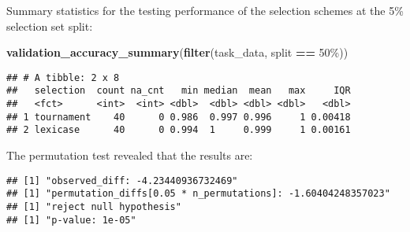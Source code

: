 \documentclass[
]{book}
\newenvironment{Shaded}{\begin{snugshade}}{\end{snugshade}}
\newcommand{\AttributeTok}[1]{\textcolor[rgb]{0.13,0.29,0.53}{#1}}
\newcommand{\DecValTok}[1]{\textcolor[rgb]{0.00,0.00,0.81}{#1}}
\newcommand{\FunctionTok}[1]{\textcolor[rgb]{0.13,0.29,0.53}{\textbf{#1}}}
\newcommand{\NormalTok}[1]{#1}
\newcommand{\OtherTok}[1]{\textcolor[rgb]{0.56,0.35,0.01}{#1}}
\newcommand{\SpecialCharTok}[1]{\textcolor[rgb]{0.81,0.36,0.00}{\textbf{#1}}}
\newcommand{\StringTok}[1]{\textcolor[rgb]{0.31,0.60,0.02}{#1}}
\begin{document}
Summary statistics for the testing performance of the selection schemes at the 5\% selection set split:

\begin{Shaded}
\begin{Highlighting}[]
\FunctionTok{validation\_accuracy\_summary}\NormalTok{(}\FunctionTok{filter}\NormalTok{(task\_data, split }\SpecialCharTok{==} \StringTok{\textquotesingle{}50\%\textquotesingle{}}\NormalTok{))}
\end{Highlighting}
\end{Shaded}

\begin{verbatim}
## # A tibble: 2 x 8
##   selection  count na_cnt   min median  mean   max     IQR
##   <fct>      <int>  <int> <dbl>  <dbl> <dbl> <dbl>   <dbl>
## 1 tournament    40      0 0.986  0.997 0.996     1 0.00418
## 2 lexicase      40      0 0.994  1     0.999     1 0.00161
\end{verbatim}

The permutation test revealed that the results are:

\begin{Shaded}
\end{Shaded}

\begin{verbatim}
## [1] "observed_diff: -4.23440936732469"
## [1] "permutation_diffs[0.05 * n_permutations]: -1.60404248357023"
## [1] "reject null hypothesis"
## [1] "p-value: 1e-05"
\end{verbatim}
\end{document}
